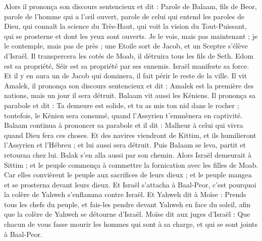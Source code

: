 \begin{multicols}{2}
Alors il prononça son discours sentencieux et dit : Parole de Balaam, fils de Beor, parole de l'homme qui a l'œil ouvert,
parole de celui qui entend les paroles de Dieu, qui connaît la science du Très-Haut, qui voit la vision du Tout-Puissant, qui se prosterne et dont les yeux sont ouverts.
Je le vois, mais pas maintenant ; je le contemple, mais pas de près ; une Etoile sort de Jacob, et un Sceptre s'élève d'Israël. Il transpercera les cotés de Moab, il détruira tous les fils de Seth.
Edom est sa propriété, Séir est sa propriété par ses ennemis. Israël manifeste sa force.
Et il y en aura un de Jacob qui dominera, il fait périr le reste de la ville.
Il vit Amalek, il prononça son discours sentencieux et dit : Amalek est la première des nations, mais un jour il sera détruit.
Balaam vit aussi les Kéniens. Il prononça sa parabole et dit : Ta demeure est solide, et tu as mis ton nid dans le rocher ;
toutefois, le Kénien sera consumé, quand l'Assyrien t'emmènera en captivité.
Balaam continua à prononcer sa parabole et il dit : Malheur à celui qui vivra quand Dieu fera ces choses.
Et des navires viendront de Kittim, et ils humilieront l'Assyrien et l'Hébreu ; et lui aussi sera détruit.
Puis Balaam se leva, partit et retourna chez lui. Balak s'en alla aussi par son chemin.
\VerseOne{}Alors Israël demeurait à Sittim ; et le peuple commença à commettre la fornication avec les filles de Moab.
Car elles convièrent le peuple aux sacrifices de leurs dieux ; et le peuple mangea et se prosterna devant leurs dieux.
Et Israël s'attacha à Baal-Peor, c'est pourquoi la colère de Yahweh s'enflamma contre Israël.
Et Yahweh dit à Moïse : Prends tous les chefs du peuple, et fais-les pendre  devant Yahweh en face du soleil, afin que la colère de Yahweh se détourne d'Israël.
Moïse dit aux juges d'Israël : Que chacun de vous fasse mourir les hommes qui sont à sa charge, et qui se sont joints à Baal-Peor.

\end{multicols}
